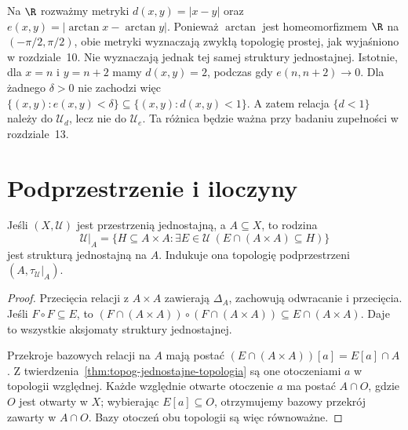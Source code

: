 \begin{przyklad}
\label{ex:topog-jednostajne-dwie-metryki}
Na $\R$ rozważmy metryki
$d(x,y)=|x-y|$ oraz
$e(x,y)=|\arctan x-\arctan y|$.
Ponieważ $\arctan$ jest homeomorfizmem
$\R$ na $(-\pi/2,\pi/2)$, obie metryki
wyznaczają zwykłą topologię prostej,
jak wyjaśniono w rozdziale~10.
Nie wyznaczają jednak tej samej struktury
jednostajnej. Istotnie, dla $x=n$ i $y=n+2$
mamy $d(x,y)=2$, podczas gdy
$e(n,n+2)\to0$. Dla żadnego $\delta>0$
nie zachodzi więc
$\{(x,y):e(x,y)<\delta\}
 \subseteq\{(x,y):d(x,y)<1\}$.
A zatem relacja $\{d<1\}$ należy do
$\mathcal U_d$, lecz nie do $\mathcal U_e$.
Ta różnica będzie ważna przy badaniu
zupełności w rozdziale~13.
\end{przyklad}

\section{Podprzestrzenie i iloczyny}
\label{sec:topog-jednostajne-konstrukcje}

\begin{twierdzenie}
\label{thm:topog-jednostajne-podprzestrzen}
Jeśli $(X,\mathcal U)$ jest przestrzenią jednostajną,
a $A\subseteq X$, to rodzina
\[
 \mathcal U|_A=\{H\subseteq A\times A:
       \exists E\in\mathcal U\
          (E\cap(A\times A)\subseteq H)\}
\]
jest strukturą jednostajną na $A$.
Indukuje ona topologię podprzestrzeni
$(A,\tau_{\mathcal U}|_A)$.
\end{twierdzenie}
\begin{proof}
Przecięcia relacji z $A\times A$ zawierają
$\Delta_A$, zachowują odwracanie i przecięcia.
Jeśli $F\circ F\subseteq E$, to
$(F\cap(A\times A))\circ(F\cap(A\times A))
\subseteq E\cap(A\times A)$.
Daje to wszystkie aksjomaty struktury jednostajnej.

Przekroje bazowych relacji na $A$ mają postać
$(E\cap(A\times A))[a]=E[a]\cap A$.
Z twierdzenia~\ref{thm:topog-jednostajne-topologia}
są one otoczeniami $a$ w topologii względnej.
Każde względnie otwarte otoczenie $a$ ma
postać $A\cap O$, gdzie $O$ jest otwarty
w $X$; wybierając $E[a]\subseteq O$,
otrzymujemy bazowy przekrój zawarty w
$A\cap O$. Bazy otoczeń obu topologii są
więc równoważne.
\end{proof}

